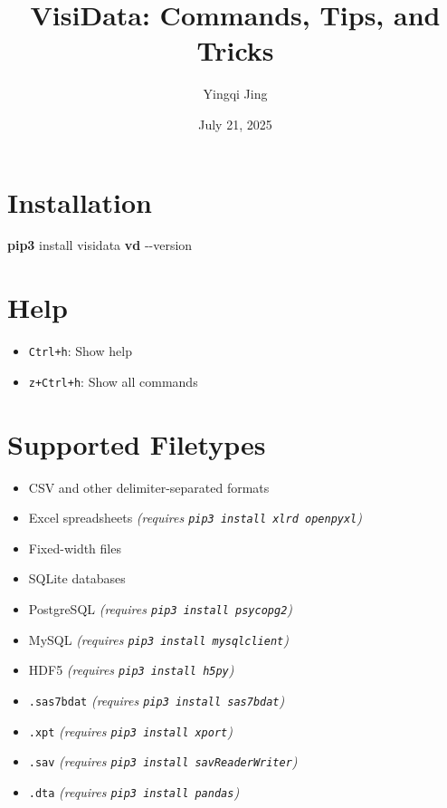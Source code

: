 \documentclass[
  letterpaper,
  DIV=11,
  numbers=noendperiod]{scrartcl}
\title{VisiData: Commands, Tips, and Tricks}
\author{Yingqi Jing}
\date{July 21, 2025}
\newenvironment{Shaded}{}{}
\newcommand{\AttributeTok}[1]{\textcolor[rgb]{0.65,0.15,0.64}{#1}}
\newcommand{\ExtensionTok}[1]{\textcolor[rgb]{0.25,0.47,0.95}{\textbf{#1}}}
\newcommand{\NormalTok}[1]{\textcolor[rgb]{0.22,0.23,0.26}{#1}}
\providecommand{\tightlist}{%
  \setlength{\itemsep}{0pt}\setlength{\parskip}{0pt}}\usepackage{longtable,booktabs,array}
\renewcommand*\contentsname{Table of contents}
\newcommand\contentsname{Table of contents}
\begin{document}
\maketitle

\renewcommand*\contentsname{Contents}
{
\hypersetup{linkcolor=}
\setcounter{tocdepth}{4}
\tableofcontents
}
\listoffigures
\listoftables

\clearpage

\section{Installation}\label{installation}

\begin{Shaded}
\begin{Highlighting}[]
\ExtensionTok{pip3}\NormalTok{ install visidata}
\ExtensionTok{vd} \AttributeTok{{-}{-}version}
\end{Highlighting}
\end{Shaded}

\section{Help}\label{help}

\begin{itemize}
\tightlist
\item
  \texttt{Ctrl+h}: Show help
\item
  \texttt{z+Ctrl+h}: Show all commands
\end{itemize}

\section{Supported Filetypes}\label{supported-filetypes}

\begin{itemize}
\tightlist
\item
  CSV and other delimiter-separated formats
\item
  Excel spreadsheets \emph{(requires
  \texttt{pip3\ install\ xlrd\ openpyxl})}
\item
  Fixed-width files
\item
  SQLite databases
\item
  PostgreSQL \emph{(requires \texttt{pip3\ install\ psycopg2})}
\item
  MySQL \emph{(requires \texttt{pip3\ install\ mysqlclient})}
\item
  HDF5 \emph{(requires \texttt{pip3\ install\ h5py})}
\item
  \texttt{.sas7bdat} \emph{(requires \texttt{pip3\ install\ sas7bdat})}
\item
  \texttt{.xpt} \emph{(requires \texttt{pip3\ install\ xport})}
\item
  \texttt{.sav} \emph{(requires
  \texttt{pip3\ install\ savReaderWriter})}
\item
  \texttt{.dta} \emph{(requires \texttt{pip3\ install\ pandas})}
\end{itemize}
\end{document}

